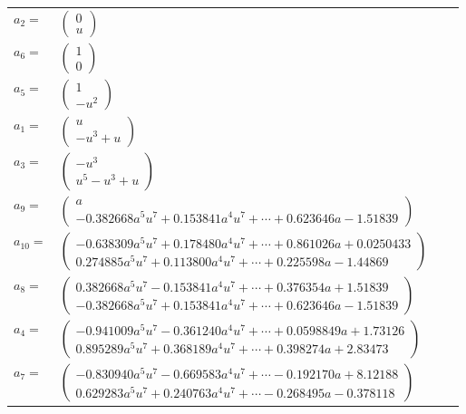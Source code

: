 \documentclass[1p]{elsarticle_modified}
\theoremstyle{definition}
\begin{document}
\begin{tabular}{m{7pt} m{180pt} m{7pt} m{180pt} }
\flushright $a_{2}=$&$\begin{pmatrix}0\\u\end{pmatrix}$ \\
\flushright $a_{6}=$&$\begin{pmatrix}1\\0\end{pmatrix}$ \\
\flushright $a_{5}=$&$\begin{pmatrix}1\\- u^2\end{pmatrix}$ \\
\flushright $a_{1}=$&$\begin{pmatrix}u\\- u^3+u\end{pmatrix}$ \\
\flushright $a_{3}=$&$\begin{pmatrix}- u^3\\u^5- u^3+u\end{pmatrix}$ \\
\flushright $a_{9}=$&$\begin{pmatrix}a\\-0.382668 a^{5} u^{7}+0.153841 a^{4} u^{7}+\cdots+0.623646 a-1.51839\end{pmatrix}$ \\
\flushright $a_{10}=$&$\begin{pmatrix}-0.638309 a^{5} u^{7}+0.178480 a^{4} u^{7}+\cdots+0.861026 a+0.0250433\\0.274885 a^{5} u^{7}+0.113800 a^{4} u^{7}+\cdots+0.225598 a-1.44869\end{pmatrix}$ \\
\flushright $a_{8}=$&$\begin{pmatrix}0.382668 a^{5} u^{7}-0.153841 a^{4} u^{7}+\cdots+0.376354 a+1.51839\\-0.382668 a^{5} u^{7}+0.153841 a^{4} u^{7}+\cdots+0.623646 a-1.51839\end{pmatrix}$ \\
\flushright $a_{4}=$&$\begin{pmatrix}-0.941009 a^{5} u^{7}-0.361240 a^{4} u^{7}+\cdots+0.0598849 a+1.73126\\0.895289 a^{5} u^{7}+0.368189 a^{4} u^{7}+\cdots+0.398274 a+2.83473\end{pmatrix}$ \\
\flushright $a_{7}=$&$\begin{pmatrix}-0.830940 a^{5} u^{7}-0.669583 a^{4} u^{7}+\cdots-0.192170 a+8.12188\\0.629283 a^{5} u^{7}+0.240763 a^{4} u^{7}+\cdots-0.268495 a-0.378118\end{pmatrix}$ \\

\end{tabular}
\end{document}
